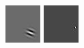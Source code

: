 \begin{figure}[ht]
 \includegraphics[width=\textwidth*11/100]{ch5/figures/firstgabor_C3.jpg}
 \includegraphics[width=\textwidth*11/100]{ch5/figures/firstgabor_C4.jpg}

\end{figure}
